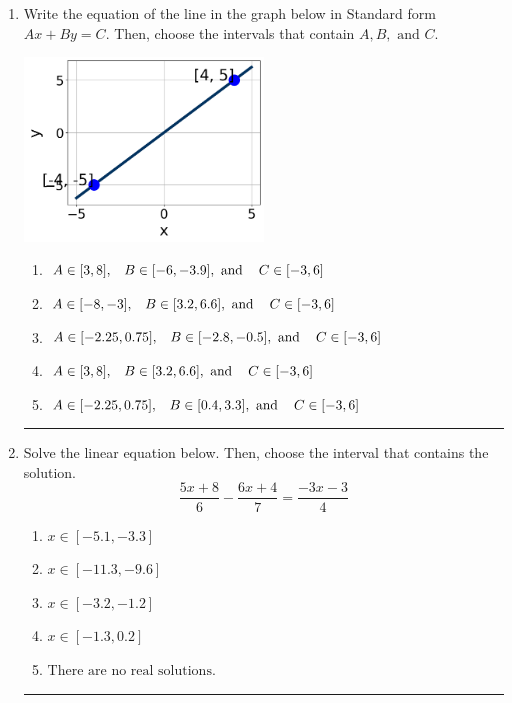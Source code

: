 \documentclass[14pt]{extbook}
\newcommand{\litem}[1]{\item#1\hspace*{-1cm}\rule{\textwidth}{0.4pt}}
\begin{document}
\begin{enumerate}
{\begin{enumerate}[label=\Alph*.]
\end{enumerate} }
\litem{
Write the equation of the line in the graph below in Standard form $Ax+By=C$. Then, choose the intervals that contain $A, B, \text{ and } C$.
\begin{center}
    \includegraphics[width=0.5\textwidth]{../Figures/linearGraphToStandardCopyA.png}
\end{center}
\begin{enumerate}[label=\Alph*.]
\item \( A \in [3, 8], \hspace{3mm} B \in [-6, -3.9], \text{ and } \hspace{3mm} C \in [-3, 6] \)
\item \( A \in [-8, -3], \hspace{3mm} B \in [3.2, 6.6], \text{ and } \hspace{3mm} C \in [-3, 6] \)
\item \( A \in [-2.25, 0.75], \hspace{3mm} B \in [-2.8, -0.5], \text{ and } \hspace{3mm} C \in [-3, 6] \)
\item \( A \in [3, 8], \hspace{3mm} B \in [3.2, 6.6], \text{ and } \hspace{3mm} C \in [-3, 6] \)
\item \( A \in [-2.25, 0.75], \hspace{3mm} B \in [0.4, 3.3], \text{ and } \hspace{3mm} C \in [-3, 6] \)

\end{enumerate} }
\litem{
Solve the linear equation below. Then, choose the interval that contains the solution.\[ \frac{5x + 8}{6} - \frac{6x + 4}{7} = \frac{-3x -3}{4} \]\begin{enumerate}[label=\Alph*.]
\item \( x \in [-5.1, -3.3] \)
\item \( x \in [-11.3, -9.6] \)
\item \( x \in [-3.2, -1.2] \)
\item \( x \in [-1.3, 0.2] \)
\item \( \text{There are no real solutions.} \)


\end{enumerate}}
\end{enumerate}
\end{document}
